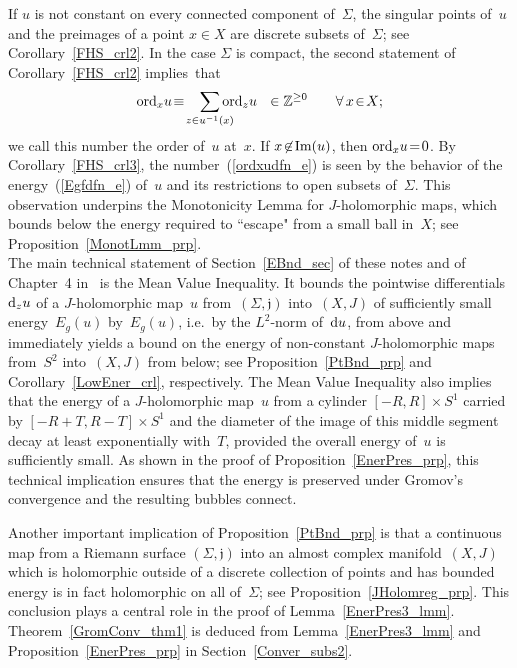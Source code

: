 \documentclass[11pt]{article}
\numberwithin{equation}{section}
\theoremstyle{definition}
\def\BE#1{\begin{equation}\label{#1}}
\def\EE{\end{equation}}
\def\eref#1{(\ref{#1})}
\def\sf#1{\textsf{#1}}
\def\fj{\mathfrak j}
\def\Z{{\mathbb Z}}
\def\Si{\Sigma}
\def\Im{\textnormal{Im}}
\def\nd{\textnormal{d}}
\def\ord{\textnormal{ord}}
\begin{document}
\noindent
If $u$ is not constant on every connected component of~$\Si$,
the singular points of~$u$ and the preimages of a point $x\!\in\!X$ 
are discrete subsets of~$\Si$; see Corollary~\ref{FHS_crl2}. 
In the case $\Si$ is compact, the second statement of Corollary~\ref{FHS_crl2} implies~that 
\BE{ordxudfn_e}\ord_xu\!\equiv\!\sum_{z\in u^{-1}(x)}\!\!\!\!\!\!\ord_zu
~~\in\Z^{\ge0}
\qquad\forall\,x\!\in\!X;\EE
we call this number the \sf{order of~$u$ at~$x$}.
If $x\!\not\in\!\Im(u)$, then $\ord_xu\!=\!0$.
By Corollary~\ref{FHS_crl3}, the number~\eref{ordxudfn_e} is seen by the behavior of 
the energy~\eref{Egfdfn_e} of~$u$ and its restrictions to open subsets of~$\Si$.
This observation underpins the \sf{Monotonicity Lemma} for $J$-holomorphic maps,
which bounds below the energy required to ``escape" from a small ball in~$X$;
see Proposition~\ref{MonotLmm_prp}.\\

\noindent
The main technical statement of Section~\ref{EBnd_sec} of these notes and 
of Chapter~4 in~\cite{MS12} is the \sf{Mean Value Inequality}.
It bounds the pointwise differentials $\nd_zu$ of a $J$-holomorphic map~$u$ 
from~$(\Si,\fj)$ into~$(X,J)$ of sufficiently small energy~$E_g(u)$ by~$E_g(u)$,
i.e.~by the $L^2$-norm of~$\nd u$, from above and immediately yields a bound
on the energy of non-constant $J$-holomorphic maps from~$S^2$ into~$(X,J)$ from below; 
see Proposition~\ref{PtBnd_prp} and Corollary~\ref{LowEner_crl}, respectively.
The Mean Value Inequality also implies that the energy of a $J$-holomorphic map~$u$ 
from a cylinder $[-R,R]\!\times\!S^1$ carried by \hbox{$[-R\!+\!T,R\!-\!T]\!\times\!S^1$}
and the diameter of the image of this middle segment decay at least exponentially 
with~$T$, provided the overall energy of~$u$ is sufficiently small.
As shown in the proof of Proposition~\ref{EnerPres_prp}, 
this technical implication ensures that \sf{the energy is preserved} under Gromov's convergence
and the resulting \sf{bubbles connect}.\\


\begin{figure}[omitted: a diagram of this paper's results, not reproduced here]\label{connect_fig}\end{figure}

\noindent
Another important implication of Proposition~\ref{PtBnd_prp} is that a continuous map
from a Riemann surface $(\Si,\fj)$ into an almost complex manifold~$(X,J)$
which is holomorphic outside of a discrete collection of points 
and has bounded energy is in fact holomorphic on all of~$\Si$;
see Proposition~\ref{JHolomreg_prp}.
This conclusion plays a central role in the proof of Lemma~\ref{EnerPres3_lmm}.
Theorem~\ref{GromConv_thm1} is deduced from Lemma~\ref{EnerPres3_lmm} and 
Proposition~\ref{EnerPres_prp} in Section~\ref{Conver_subs2}.\\
\end{document}
